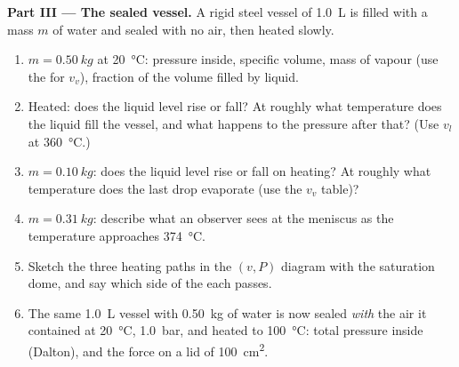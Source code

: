 \begin{problem}
\medskip
\noindent\textbf{Part III --- The sealed vessel.}
A rigid steel vessel of \qty{1.0}{L} is filled with a mass $m$ of water
and sealed with no air, then heated slowly.
\begin{enumerate}[resume]
  \item $m = \qty{0.50}{kg}$ at \qty{20}{\degreeCelsius}: pressure inside,
        specific volume, mass of vapour (use the  for $v_v$),
        fraction of the volume filled by liquid.
  \item Heated: does the liquid level rise or fall? At roughly what
        temperature does the liquid fill the vessel, and what happens to
        the pressure after that? (Use $v_l$ at \qty{360}{\degreeCelsius}.)
  \item $m = \qty{0.10}{kg}$: does the liquid level rise or fall on
        heating? At roughly what temperature does the last drop
        evaporate (use the $v_v$ table)?
  \item $m = \qty{0.31}{kg}$: describe what an observer sees at the
        meniscus as the temperature approaches \qty{374}{\degreeCelsius}.
  \item Sketch the three heating paths in the $(v, P)$ diagram with the
        saturation dome, and say which side of the  each
        passes.
  \item The same \qty{1.0}{L} vessel with \qty{0.50}{kg} of water is now
        sealed \emph{with} the air it contained at \qty{20}{\degreeCelsius},
        \qty{1.0}{bar}, and heated to \qty{100}{\degreeCelsius}: total
        pressure inside (Dalton), and the force on a lid of \qty{100}{cm^2}.
\end{enumerate}


\end{problem}
